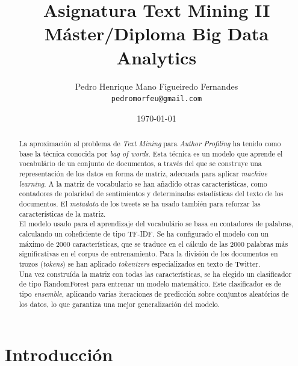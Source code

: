 \documentclass[11pt,a4paper]{article}
\title{Asignatura Text Mining II\\
M\'aster/Diploma Big Data Analytics}
\author{Pedro Henrique Mano Figueiredo Fernandes \\
  {\tt pedromorfeu@gmail.com} \\}
\date{\today}
\begin{document}
\maketitle
\begin{abstract}

  \indent La aproximaci\'on al problema de {\em Text Mining} para {\em Author Profiling} ha tenido como base la t\'ecnica conocida por {\em bag of words}. Esta t\'ecnica es un modelo que aprende el vocabul\'ario de un conjunto de documentos, a trav\'es del que se construye una representaci\'on de los datos en forma de matriz, adecuada para aplicar {\em machine learning}. A la matriz de vocabulario se han a\~nadido otras caracter\'isticas, como contadores de polaridad de sentimientos y determinadas estad\'isticas del texto de los documentos. El {\em metadata} de los tweets se ha usado tambi\'en para reforzar las caracter\'isticas de la matriz.\\
  \indent El modelo usado para el aprendizaje del vocabul\'ario se basa en contadores de palabras, calculando un coheficiente de tipo TF-IDF. Se ha configurado el modelo con un m\'aximo de 2000 caracter\'isticas, que se traduce en el c\'alculo de las 2000 palabras más significativas en el corpus de entrenamiento. Para la divisi\'on de los documentos en trozos ({\em tokens}) se han aplicado {\em tokenizers} especializados en texto de Twitter.\\
  \indent Una vez constru\'ida la matriz con todas las caracter\'isticas, se ha elegido un clasificador de tipo RandomForest para entrenar un modelo matem\'atico. Este clasificador es de tipo {\em ensemble}, aplicando varias iteraciones de predicci\'on sobre conjuntos aleat\'orios de los datos, lo que garantiza una mejor generalizaci\'on del modelo.

\end{abstract}


\section{Introducci\'on}
\end{document}
